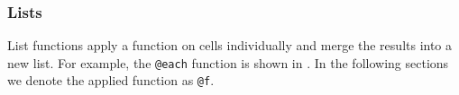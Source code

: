 \begin{comment}
\begin{table}[htbp]
\centering
\caption{Rules for Special boolean functions (B)} \label{rule_boolean}
\begin{small}
\begin{tabular}{|c||c|c|c|c|}
\hline
$F_{B}$(x,y)  & \multicolumn{4}{c|}{x} \\ \hline
y               & \shapeS & \shapeV{$c_0$} & \shapeV{$d_0$} & \shapeVS{$a_0$} \\ \hline
\shapeS         & \shapeS  & \shapeV{$c_0$} & \shapeV{$d_0$} & \shapeVS{$a_0$} \\ 
\shapeV{$c_1$}  & \shapeS  & \shapeV{$c_0$} & \shapeV{$d_0$} & \shapeVS{$a_0$} \\ 
\shapeV{$d_1$}  & \shapeS  & \shapeV{$c_0$} & \shapeV{$d_0$} & \shapeVS{$a_0$} \\ 
\shapeVS{$a_1$} & \shapeS  & \shapeV{$c_0$} & \shapeV{$d_0$} & \shapeVS{$a_0$} \\ \hline
\end{tabular}
\end{small}
\end{table}
\end{comment}


\subsubsection{Lists}

List functions apply a function on cells individually and merge the results into a new list.
For example, the \texttt{@each} function is shown in . In the
following sections we denote the applied function as \texttt{@f}.

